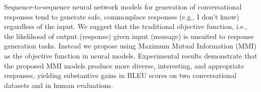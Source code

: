 Sequence-to-sequence neural network models for generation of conversational responses tend to generate safe, commonplace responses (e.g., I don't know) regardless of the input. We suggest that the traditional objective function, i.e., the likelihood of output (response) given input (message) is unsuited to response generation tasks. Instead we propose using Maximum Mutual Information (MMI) as the objective function in neural models. Experimental results demonstrate that the proposed MMI models produce more diverse, interesting, and appropriate responses, yielding substantive gains in BLEU scores on two conversational datasets and in human evaluations.
